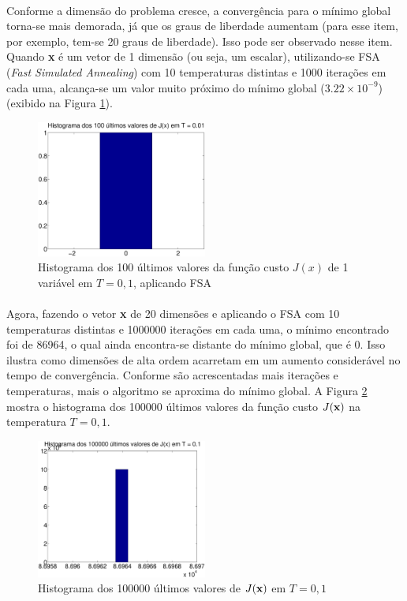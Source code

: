 \documentclass{report}
\begin{document}
\paragraph{} Conforme a dimensão do problema cresce, a convergência para o mínimo global torna-se mais demorada, já que os graus de liberdade aumentam (para esse item, por exemplo, tem-se 20 graus de liberdade). Isso pode ser observado nesse item. Quando \textbf{x} é um vetor de 1 dimensão (ou seja, um escalar), utilizando-se FSA (\emph{Fast Simulated Annealing}) com 10 temperaturas distintas e 1000 iterações em cada uma, alcança-se um valor muito próximo do mínimo global ($3.22 \times 10^{-9}$) (exibido na Figura \ref{fsa_2d}).\\ 

\begin{figure}[H]
	\centering
	\includegraphics[width = 0.5\textwidth]{Q2_hist_J_uma_variavel}
	\caption{Histograma dos 100 últimos valores da função custo $J(x)$ de 1 variável em $T = 0,1$, aplicando FSA}
	\label{fsa_2d}
\end{figure}

\paragraph{} Agora, fazendo o vetor \textbf{x} de 20 dimensões e aplicando o FSA com 10 temperaturas distintas e 1000000 iterações em cada uma, o mínimo encontrado foi de 86964, o qual ainda encontra-se distante do mínimo global, que é 0. Isso ilustra como dimensões de alta ordem acarretam em um aumento considerável no tempo de convergência. Conforme são acrescentadas mais iterações e temperaturas, mais o algoritmo se aproxima do mínimo global. A Figura \ref{fsa_20_variaveis} mostra o histograma dos 100000 últimos valores da função custo $J(\text{\textbf{x}})$ na temperatura $T = 0,1$.\\

\begin{figure}[H]
	\centering
	\includegraphics[width = 0.5\textwidth]{Q2_hist_J_vinte_variaveis_fsa}
	\caption{Histograma dos 100000 últimos valores de $J(\text{\textbf{x}})$ em $T = 0,1$}
	\label{fsa_20_variaveis}
\end{figure}
\end{document}
